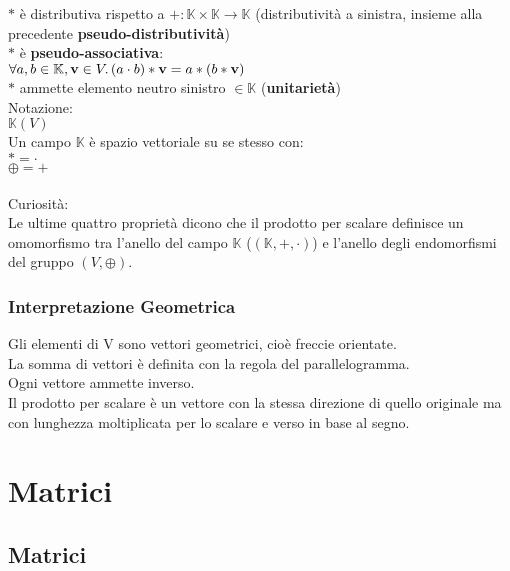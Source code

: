 \documentclass[a4paper, twoside, italian, 11pt]{book}
\newcommand{\K}{\mathbb{K}}
\begin{document}
\noindent
$*$ è distributiva rispetto a $+ : \K \times \K \rightarrow \K$ (distributività a sinistra, insieme alla precedente \textbf{pseudo-distributività}) \\

\noindent
$*$ è \textbf{pseudo-associativa}: \\
\indent
$\forall a, b \in \K, \textbf{v} \in V \ldotp (a \cdot b) * \textbf{v} = a * (b * \textbf{v})$ \\

\noindent
$*$ ammette elemento neutro sinistro $\in \K$ (\textbf{unitarietà}) \\

\noindent
Notazione: \\
\indent
$\K(V)$ \\

\noindent
Un campo $\K$ è spazio vettoriale su se stesso con: \\
\indent
$* = \cdot$ \\
\indent
$\oplus = +$\\\\

\noindent
Curiosità: \\
Le ultime quattro proprietà dicono che il prodotto per scalare definisce un omomorfismo tra l'anello del campo $\K$ ($(\K, +, \cdot)$) e l'anello degli endomorfismi del gruppo $(V, \oplus)$.


\subsection{Interpretazione Geometrica}

Gli elementi di V sono vettori geometrici, cioè freccie orientate. \\
La somma di vettori è definita con la regola del parallelogramma. \\
Ogni vettore ammette inverso. \\
Il prodotto per scalare è un vettore con la stessa direzione di quello originale ma con lunghezza moltiplicata per lo scalare e verso in base al segno. \\




\chapter{Matrici}



\section {Matrici}
\end{document}
